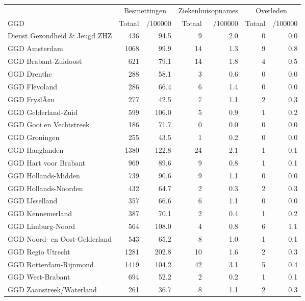 \documentclass[
  english,
  man,floatsintext]{apa6}
\begin{document}
\begin{table}
\centering\begingroup\fontsize{10}{12}\selectfont

\begin{threeparttable}
\begin{tabular}{lrrrrrr}
\toprule
\multicolumn{1}{c}{ } & \multicolumn{2}{c}{Besmettingen} & \multicolumn{2}{c}{Ziekenhuisopnames} & \multicolumn{2}{c}{Overleden} \\
\cmidrule(l{3pt}r{3pt}){2-3} \cmidrule(l{3pt}r{3pt}){4-5} \cmidrule(l{3pt}r{3pt}){6-7}
GGD & Totaal & /100000 & Totaal & /100000 & Totaal & /100000\\
\midrule
Dienst Gezondheid \& Jeugd ZHZ & 436 & 94.5 & 9 & 2.0 & 0 & 0.0\\
GGD Amsterdam & 1068 & 99.9 & 14 & 1.3 & 9 & 0.8\\
GGD Brabant-Zuidoost & 621 & 79.1 & 14 & 1.8 & 4 & 0.5\\
GGD Drenthe & 288 & 58.1 & 3 & 0.6 & 0 & 0.0\\
GGD Flevoland & 286 & 66.4 & 6 & 1.4 & 0 & 0.0\\
GGD FryslÃ¢n & 277 & 42.5 & 7 & 1.1 & 2 & 0.3\\
GGD Gelderland-Zuid & 599 & 106.0 & 5 & 0.9 & 1 & 0.2\\
GGD Gooi en Vechtstreek & 186 & 71.7 & 0 & 0.0 & 0 & 0.0\\
GGD Groningen & 255 & 43.5 & 1 & 0.2 & 0 & 0.0\\
GGD Haaglanden & 1380 & 122.8 & 24 & 2.1 & 1 & 0.1\\
GGD Hart voor Brabant & 969 & 89.6 & 9 & 0.8 & 1 & 0.1\\
GGD Hollands-Midden & 739 & 90.6 & 9 & 1.1 & 0 & 0.0\\
GGD Hollands-Noorden & 432 & 64.7 & 2 & 0.3 & 2 & 0.3\\
GGD IJsselland & 357 & 66.6 & 6 & 1.1 & 0 & 0.0\\
GGD Kennemerland & 387 & 70.1 & 2 & 0.4 & 1 & 0.2\\
GGD Limburg-Noord & 564 & 108.0 & 4 & 0.8 & 6 & 1.1\\
GGD Noord- en Oost-Gelderland & 543 & 65.2 & 8 & 1.0 & 1 & 0.1\\
GGD Regio Utrecht & 1281 & 202.8 & 10 & 1.6 & 2 & 0.3\\
GGD Rotterdam-Rijnmond & 1419 & 104.2 & 42 & 3.1 & 5 & 0.4\\
GGD West-Brabant & 694 & 52.2 & 2 & 0.2 & 1 & 0.1\\
GGD Zaanstreek/Waterland & 261 & 36.7 & 8 & 1.1 & 2 & 0.3\\

\end{tabular}
\end{threeparttable}
\end{table}
\end{document}
